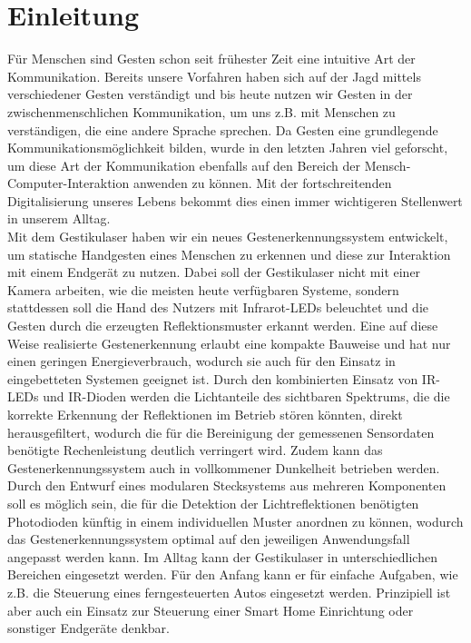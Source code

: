 \chapter{Einleitung}
\label{ch:Einleitung}

Für Menschen sind Gesten schon seit frühester Zeit eine intuitive Art der Kommunikation. Bereits unsere Vorfahren haben sich auf der Jagd mittels verschiedener Gesten verständigt und bis heute nutzen wir Gesten in der zwischenmenschlichen Kommunikation, um uns z.B. mit Menschen zu verständigen, die eine andere Sprache sprechen. Da Gesten eine grundlegende Kommunikationsmöglichkeit bilden, wurde in den letzten Jahren viel geforscht, um diese Art der Kommunikation ebenfalls auf den Bereich der Mensch-Computer-Interaktion anwenden zu können. Mit der fortschreitenden Digitalisierung unseres Lebens bekommt dies einen immer wichtigeren Stellenwert in unserem Alltag.\\
Mit dem Gestikulaser haben wir ein neues Gestenerkennungssystem entwickelt, um statische Handgesten eines Menschen zu erkennen und diese zur Interaktion mit einem Endgerät zu nutzen. Dabei soll der Gestikulaser nicht mit einer Kamera arbeiten, wie die meisten heute verfügbaren Systeme, sondern stattdessen soll die Hand des Nutzers mit Infrarot-LEDs beleuchtet und die Gesten durch die erzeugten Reflektionsmuster erkannt werden. Eine auf diese Weise realisierte Gestenerkennung erlaubt eine kompakte Bauweise und hat nur einen geringen Energieverbrauch, wodurch sie auch für den Einsatz in eingebetteten Systemen geeignet ist. Durch den kombinierten Einsatz von IR-LEDs und IR-Dioden werden die Lichtanteile des sichtbaren Spektrums, die die korrekte Erkennung der Reflektionen im Betrieb stören könnten, direkt herausgefiltert, wodurch die für die Bereinigung der gemessenen Sensordaten benötigte Rechenleistung deutlich verringert wird. Zudem kann das Gestenerkennungssystem auch in vollkommener Dunkelheit betrieben werden. \\
Durch den Entwurf eines modularen Stecksystems aus mehreren Komponenten soll es möglich sein, die für die Detektion der Lichtreflektionen benötigten Photodioden künftig in einem individuellen Muster anordnen zu können, wodurch das Gestenerkennungssystem optimal auf den jeweiligen Anwendungsfall angepasst werden kann. Im Alltag kann der Gestikulaser in unterschiedlichen Bereichen eingesetzt werden. Für den Anfang kann er für einfache Aufgaben, wie z.B. die Steuerung eines ferngesteuerten Autos eingesetzt werden. Prinzipiell ist aber auch ein Einsatz zur Steuerung einer Smart Home Einrichtung oder sonstiger Endgeräte denkbar.